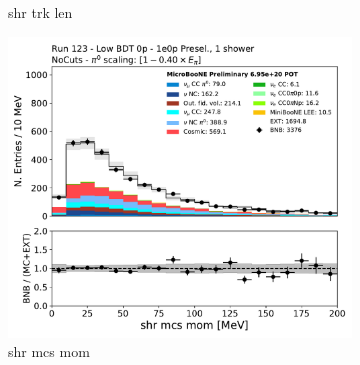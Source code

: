 \begin{figure}[H]
\begin{subfigure}{0.3\textwidth}
    \caption{shr trk len}
    \end{subfigure}
    \begin{subfigure}{0.3\textwidth}
    \includegraphics[width=1.0\textwidth]{1e0p/Low_BDT_Sideband/shrMCSMom.pdf}
    \caption{shr mcs mom}
    \end{subfigure}
    \caption{} 
    \label{fig:HE_1eNp_1}
\end{figure}

